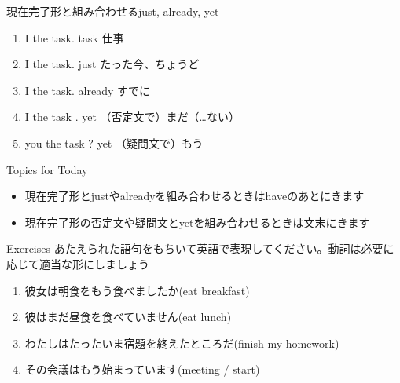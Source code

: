 \documentclass[aspectratio=169,xcolor={dvipsnames,table}]{beamer}
\begin{document}
\begin{frame}[plain]{現在完了形と組み合わせるjust, already, yet}
\begin{enumerate}
 \item<1-> I  the task.%
\hfill{}{\scriptsize task  仕事}
 \item<2-> I    the task.%
\hfill{}{\scriptsize just  たった今、ちょうど}
 \item<3-> I    the task.%
\hfill{}{\scriptsize already  すでに}
 \item<4-> I    the task .%
\hfill{}{\scriptsize yet  （否定文で）まだ（\ldots ない）}
 \item<5->  you  the task ?%
\hfill{}{\scriptsize yet  （疑問文で）もう}
\end{enumerate}

 \begin{exampleblock}{Topics for Today}
\small
\begin{itemize}[square]\small
 \item 現在完了形とjustやalreadyを組み合わせるときはhaveのあとにきます
 \item 現在完了形の否定文や疑問文とyetを組み合わせるときは文末にきます
\end{itemize}
      \end{exampleblock}
\end{frame}
\begin{frame}[plain]{Exercises}
 あたえられた語句をもちいて英語で表現してください。動詞は必要に応じて適当な形にしましょう

\begin{enumerate}
 \item 彼女は朝食をもう食べましたか(eat breakfast)\\
 \item 彼はまだ昼食を食べていません(eat lunch)\\
 \item わたしはたったいま宿題を終えたところだ(finish my homework)\\
 \item その会議はもう始まっています(meeting /  start)\\
\end{enumerate}
\end{frame}
\end{document}
